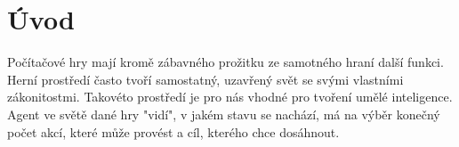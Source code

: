 \chapter*{Úvod}


Počítačové hry mají kromě zábavného prožitku ze samotného hraní další funkci.
Herní prostředí často tvoří samostatný, uzavřený svět se svými vlastními zákonitostmi.
Takovéto prostředí je pro nás vhodné pro tvoření umělé inteligence. 
Agent ve světě dané hry "vidí", v jakém stavu se nachází, má na výběr konečný počet akcí, které může provést
a cíl, kterého chce dosáhnout.  